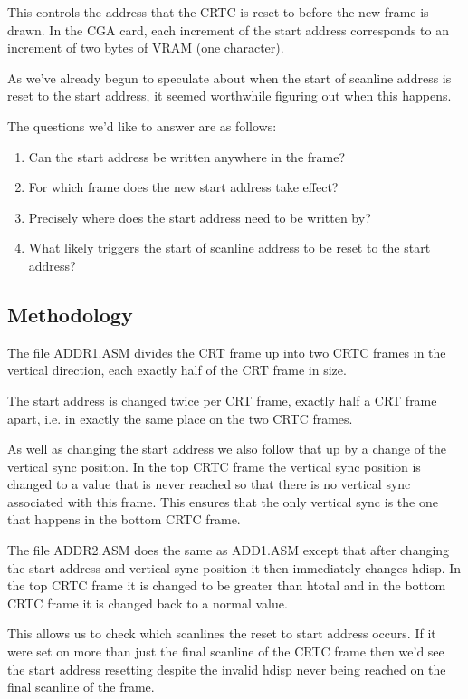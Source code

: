 \documentclass[a4paper,10pt]{amsart}
\begin{document}
This controls the address that the CRTC is reset to before the new frame is
drawn. In the CGA card, each increment of the start address corresponds to
an increment of two bytes of VRAM (one character).

As we've already begun to speculate about when the start of scanline address
is reset to the start address, it seemed worthwhile figuring out when this
happens.

The questions we'd like to answer are as follows:

\begin{enumerate}
\item Can the start address be written anywhere in the frame?
\item For which frame does the new start address take effect?
\item Precisely where does the start address need to be written by?
\item What likely triggers the start of scanline address to be reset to the start address?
\end{enumerate}

\subsection{Methodology}

The file ADDR1.ASM divides the CRT frame up into two CRTC frames in the
vertical direction, each exactly half of the CRT frame in size.

The start address is changed twice per CRT frame, exactly half a CRT frame
apart, i.e. in exactly the same place on the two CRTC frames.

As well as changing the start address we also follow that up by a change of
the vertical sync position. In the top CRTC frame the vertical sync position
is changed to a value that is never reached so that there is no vertical sync
associated with this frame. This ensures that the only vertical sync is the
one that happens in the bottom CRTC frame.

The file ADDR2.ASM does the same as ADD1.ASM except that after changing the
start address and vertical sync position it then immediately changes hdisp.
In the top CRTC frame it is changed to be greater than htotal and in the
bottom CRTC frame it is changed back to a normal value.

This allows us to check which scanlines the reset to start address occurs.
If it were set on more than just the final scanline of the CRTC frame then
we'd see the start address resetting despite the invalid hdisp never being
reached on the final scanline of the frame.
\end{document}
